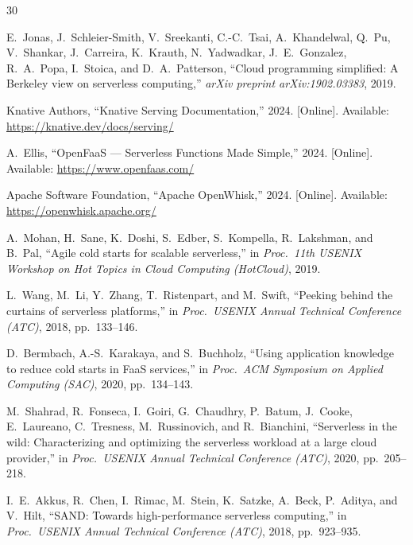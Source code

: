 \documentclass[final,5p,times,twocolumn]{elsarticle}
\begin{document}
\begin{thebibliography}{30}

E.~Jonas, J.~Schleier-Smith, V.~Sreekanti, C.-C.~Tsai, A.~Khandelwal, Q.~Pu, V.~Shankar, J.~Carreira, K.~Krauth, N.~Yadwadkar, J.~E.~Gonzalez, R.~A.~Popa, I.~Stoica, and D.~A.~Patterson, ``Cloud programming simplified: A Berkeley view on serverless computing,'' \emph{arXiv preprint arXiv:1902.03383}, 2019.

Knative Authors, ``Knative Serving Documentation,'' 2024. [Online]. Available: \url{https://knative.dev/docs/serving/}

A.~Ellis, ``OpenFaaS --- Serverless Functions Made Simple,'' 2024. [Online]. Available: \url{https://www.openfaas.com/}

Apache Software Foundation, ``Apache OpenWhisk,'' 2024. [Online]. Available: \url{https://openwhisk.apache.org/}

A.~Mohan, H.~Sane, K.~Doshi, S.~Edber, S.~Kompella, R.~Lakshman, and B.~Pal, ``Agile cold starts for scalable serverless,'' in \emph{Proc.\ 11th USENIX Workshop on Hot Topics in Cloud Computing (HotCloud)}, 2019.

L.~Wang, M.~Li, Y.~Zhang, T.~Ristenpart, and M.~Swift, ``Peeking behind the curtains of serverless platforms,'' in \emph{Proc.\ USENIX Annual Technical Conference (ATC)}, 2018, pp.~133--146.

D.~Bermbach, A.-S.~Karakaya, and S.~Buchholz, ``Using application knowledge to reduce cold starts in FaaS services,'' in \emph{Proc.\ ACM Symposium on Applied Computing (SAC)}, 2020, pp.~134--143.

M.~Shahrad, R.~Fonseca, I.~Goiri, G.~Chaudhry, P.~Batum, J.~Cooke, E.~Laureano, C.~Tresness, M.~Russinovich, and R.~Bianchini, ``Serverless in the wild: Characterizing and optimizing the serverless workload at a large cloud provider,'' in \emph{Proc.\ USENIX Annual Technical Conference (ATC)}, 2020, pp.~205--218.

I.~E.~Akkus, R.~Chen, I.~Rimac, M.~Stein, K.~Satzke, A.~Beck, P.~Aditya, and V.~Hilt, ``SAND: Towards high-performance serverless computing,'' in \emph{Proc.\ USENIX Annual Technical Conference (ATC)}, 2018, pp.~923--935.


\end{thebibliography}
\end{document}
